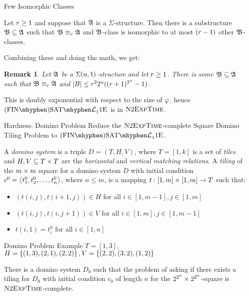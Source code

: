\documentclass{beamer}
\newtheorem{remark}{Remark}
\begin{document}
\begin{frame}{Few Isomorphic Classes}
\begin{lemma}
Let $r \geq 1$ and suppose that $\mathfrak{A}$ is a $\Sigma$-structure.
Then there is a substructure $\mathfrak{B}\subseteq\mathfrak{A}$ such that
$\mathfrak{B}\equiv_{r}\mathfrak{A}$ and $\mathfrak{B}$-class is isomorphic to at most $(r-1)$
other $\mathfrak{B}$-classes.
\end{lemma}

Combining these and doing the math, we get:
\begin{remark}
Let $\mathfrak{A}$ be a $\Sigma(u,1)$-structure and let $r\geq1$.
There is some $\mathfrak{B}\subseteq\mathfrak{A}$ such that $\mathfrak{B}\equiv_{r}\mathfrak{A}$ and
$\left|B\right| \leq r^2 2^u ((r+1)^{2^u}-1)$.
\end{remark}

This is doubly exponential with respect to the size of $\varphi$, hence
$\FinASat{\Lvp\LL\nonv1\Eea1\noag}$ is in $\text{\normalfont{\scshape N}}2\text{\normalfont{\scshape ExpTime}}$.
\end{frame}

\begin{frame}{Hardness: Domino Problem}
Reduce the $\text{\normalfont{\scshape N}}2\text{\normalfont{\scshape ExpTime}}$-complete Square Domino Tiling Problem to
$\FinASat{\Lvp\LL\nonv1\Eea1\noag}$.

A \emph{domino system} is a triple $D = (T,H,V)$, where
$T = [1,k]$ is a set of \emph{tiles} and $H,V\subseteq T\times T$ are the
\emph{horizontal} and \emph{vertical matching relations}.
A \emph{tiling} of the $m\times m$ square for a domino system $D$ with initial
condition $c^0 = \left\langle t_1^0,t_2^0,\dots,t_n^0 \right\rangle$, where $n\leq m$, is a mapping
$t : [1,m]\times [1,m]\to T$ such that:
\begin{itemize}
  \item $(t(i,j),t(i+1,j))\in H$ for all $i\in[1,m-1], j\in[1,m]$
  \item $(t(i,j),t(i,j+1))\in V$ for all $i\in[1,m], j\in[1,m-1]$
  \item $t(i,1) = t_i^0$ for all $i\in[1,n]$
\end{itemize}
\end{frame}

\begin{frame}{Domino Problem}
Example $T = [1,3]$, $H = \left\{(1,3),(2,1),(2,2)\right\}, V = \left\{(2,2),(3,2),(1,2)\right\}$

\centering
{}

\begin{theorem}
There is a domino system $D_0$ such that the problem of asking if there exists a
tiling for $D_0$ with initial condition $c_0$ of length $n$ for the
$2^{2^n}\times 2^{2^n}$-square is $\text{\normalfont{\scshape N}}2\text{\normalfont{\scshape ExpTime}}$-complete.
\end{theorem}
\end{frame}
\end{document}

